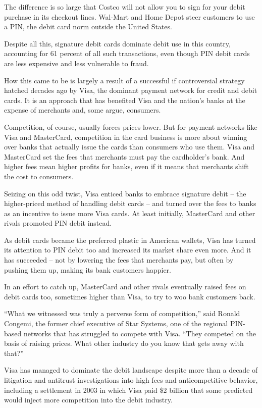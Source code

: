 ﻿\documentclass[12pt]{article}
\begin{document}
The difference is so large that Costco will not allow you to sign for your debit purchase in its
checkout lines. Wal-Mart and Home Depot steer customers to use a PIN, the debit card norm outside
the United States.

Despite all this, signature debit cards dominate debit use in this country, accounting for 61
percent of all such transactions, even though PIN debit cards are less expensive and less vulnerable
to fraud.

How this came to be is largely a result of a successful if controversial strategy hatched decades
ago by Visa, the dominant payment network for credit and debit cards. It is an approach that has
benefited Visa and the nation's banks at the expense of merchants and, some argue, consumers.

Competition, of course, usually forces prices lower. But for payment networks like Visa and
MasterCard, competition in the card business is more about winning over banks that actually issue
the cards than consumers who use them. Visa and MasterCard set the fees that merchants must pay the
cardholder's bank. And higher fees mean higher profits for banks, even if it means that merchants
shift the cost to consumers.

Seizing on this odd twist, Visa enticed banks to embrace signature debit -- the higher-priced method
of handling debit cards -- and turned over the fees to banks as an incentive to issue more Visa
cards. At least initially, MasterCard and other rivals promoted PIN debit instead.

As debit cards became the preferred plastic in American wallets, Visa has turned its attention to
PIN debit too and increased its market share even more. And it has succeeded -- not by lowering the
fees that merchants pay, but often by pushing them up, making its bank customers happier.

In an effort to catch up, MasterCard and other rivals eventually raised fees on debit cards too,
sometimes higher than Visa, to try to woo bank customers back.

``What we witnessed was truly a perverse form of competition,'' said Ronald Congemi, the former
chief executive of Star Systems, one of the regional PIN-based networks that has struggled to
compete with Visa. ``They competed on the basis of raising prices. What other industry do you know
that gets away with that?''

Visa has managed to dominate the debit landscape despite more than a decade of litigation and
antitrust investigations into high fees and anticompetitive behavior, including a settlement in 2003
in which Visa paid \$2 billion that some predicted would inject more competition into the debit
industry.
\end{document}
